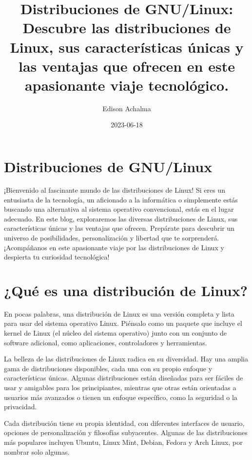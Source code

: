 \documentclass[
  jou,
  floatsintext,
  longtable,
  a4paper,
  nolmodern,
  notxfonts,
  notimes,
  colorlinks=true,linkcolor=blue,citecolor=blue,urlcolor=blue]{apa7}
\title{Distribuciones de GNU/Linux: Descubre las distribuciones de
Linux, sus características únicas y las ventajas que ofrecen en este
apasionante viaje tecnológico.}
\author{Edison Achalma}
\affiliation{
{Escuela Profesional de Economía, Universidad Nacional de San Cristóbal
de Huamanga}}
\date{2023-06-18}
\begin{document}
\maketitle

\hypertarget{toc}{}
\tableofcontents
\newpage
\section[Introduction]{Distribuciones de GNU/Linux}

\setcounter{secnumdepth}{-\maxdimen} %

\setlength\LTleft{0pt}


¡Bienvenido al fascinante mundo de las distribuciones de Linux! Si eres
un entusiasta de la tecnología, un aficionado a la informática o
simplemente estás buscando una alternativa al sistema operativo
convencional, estás en el lugar adecuado. En este blog, exploraremos las
diversas distribuciones de Linux, sus características únicas y las
ventajas que ofrecen. Prepárate para descubrir un universo de
posibilidades, personalización y libertad que te sorprenderá.
¡Acompáñanos en este apasionante viaje por las distribuciones de Linux y
despierta tu curiosidad tecnológica!

\section{¿Qué es una distribución de
Linux?}\label{quuxe9-es-una-distribuciuxf3n-de-linux}

En pocas palabras, una distribución de Linux es una versión completa y
lista para usar del sistema operativo Linux. Piénsalo como un paquete
que incluye el kernel de Linux (el núcleo del sistema operativo) junto
con un conjunto de software adicional, como aplicaciones, controladores
y herramientas.

La belleza de las distribuciones de Linux radica en su diversidad. Hay
una amplia gama de distribuciones disponibles, cada una con su propio
enfoque y características únicas. Algunas distribuciones están diseñadas
para ser fáciles de usar y amigables para los principiantes, mientras
que otras están orientadas a usuarios más avanzados o tienen un enfoque
específico, como la seguridad o la privacidad.

Cada distribución tiene su propia identidad, con diferentes interfaces
de usuario, opciones de personalización y filosofías subyacentes.
Algunas de las distribuciones más populares incluyen Ubuntu, Linux Mint,
Debian, Fedora y Arch Linux, por nombrar solo algunas.
\end{document}
